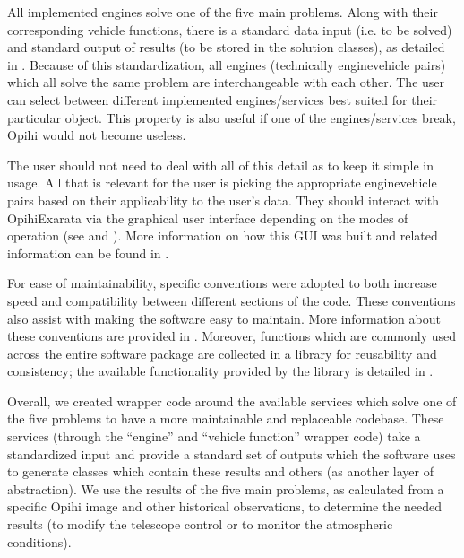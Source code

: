 \documentclass[letterpaper,11pt,english]{sphinxmanual}
\begin{document}
\sphinxAtStartPar
All implemented engines solve one of the five main problems. Along with their
corresponding vehicle functions, there is a standard data input (i.e. to be
solved) and standard output of results (to be stored in the solution classes),
as detailed in
{\hyperref[\detokenize{technical/architecture/vehicles_solutions:technical-architecture-vehicles-solutions}]{}}. Because of this
standardization, all engines (technically engine\sphinxhyphen{}vehicle pairs) which all
solve the same problem are interchangeable with each other. The user can
select between different implemented engines/services best suited for their
particular object. This property is also useful if one of the engines/services
break, Opihi would not become useless.

\sphinxAtStartPar
The user should not need to deal with all of this detail as to keep it simple
in usage. All that is relevant for the user is picking the appropriate
engine\sphinxhyphen{}vehicle pairs based on their applicability to the user’s data. They
should interact with OpihiExarata via the graphical user interface depending
on the modes of operation (see {\hyperref[\detokenize{user/automatic_mode:user-automatic-mode}]{}} and
{\hyperref[\detokenize{user/manual_mode:user-manual-mode}]{}}). More information on how this GUI was built and
related information can be found in
{\hyperref[\detokenize{technical/architecture/graphical_user_interface:technical-architecture-graphical-user-interface}]{}}.

\sphinxAtStartPar
For ease of maintainability, specific conventions were adopted to both increase
speed and compatibility between different sections of the code. These
conventions also assist with making the software easy to maintain. More
information about these conventions are provided in
{\hyperref[\detokenize{technical/conventions:technical-conventions}]{}}. Moreover, functions which are commonly used
across the entire software package are collected in a library for reusability
and consistency; the available functionality provided by the library is
detailed in {\hyperref[\detokenize{technical/architecture/library:technical-architecture-library}]{}}.

\sphinxAtStartPar
Overall, we created wrapper code around the available services which solve
one of the five problems to have a more maintainable and replaceable codebase.
These services (through the “engine” and “vehicle function” wrapper code) take
a standardized input and provide a standard set of outputs which the software
uses to generate classes which contain these results and others (as another
layer of abstraction). We use the results of the five main problems, as
calculated from a specific Opihi image and other historical observations, to
determine the needed results (to modify the telescope control or to monitor
the atmospheric conditions).
\end{document}
